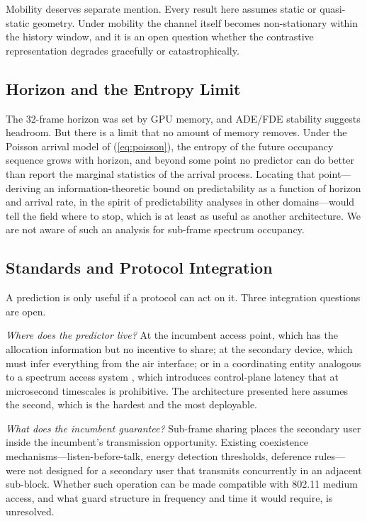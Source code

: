 \documentclass[lettersize,journal]{IEEEtran}
\begin{document}
Mobility deserves separate mention. Every result here assumes static or
quasi-static geometry. Under mobility the channel itself becomes
non-stationary within the history window, and it is an open question
whether the contrastive representation degrades gracefully or
catastrophically.

\subsection{\textbf{Horizon and the Entropy Limit}}
The 32-frame horizon was set by GPU memory, and ADE/FDE stability
suggests headroom. But there is a limit that no amount of memory
removes. Under the Poisson arrival model of (\ref{eq:poisson}), the
entropy of the future occupancy sequence grows with horizon, and beyond
some point no predictor can do better than report the marginal statistics
of the arrival process. Locating that point---deriving an
information-theoretic bound on predictability as a function of horizon
and arrival rate, in the spirit of predictability analyses in other
domains---would tell the field where to stop, which is at least as
useful as another architecture. We are not aware of such an analysis for
sub-frame spectrum occupancy.

\subsection{\textbf{Standards and Protocol Integration}}
A prediction is only useful if a protocol can act on it. Three
integration questions are open.

\emph{Where does the predictor live?} At the incumbent access point,
which has the allocation information but no incentive to share; at the
secondary device, which must infer everything from the air interface; or
in a coordinating entity analogous to a spectrum access system
\cite{FCC2015CBRS}, which introduces control-plane latency that at
microsecond timescales is prohibitive. The architecture presented here
assumes the second, which is the hardest and the most deployable.

\emph{What does the incumbent guarantee?} Sub-frame sharing places the
secondary user inside the incumbent's transmission opportunity. Existing
coexistence mechanisms---listen-before-talk, energy detection
thresholds, deference rules---were not designed for a secondary user
that transmits concurrently in an adjacent sub-block. Whether such
operation can be made compatible with 802.11 medium access, and what
guard structure in frequency and time it would require, is unresolved.
\end{document}
